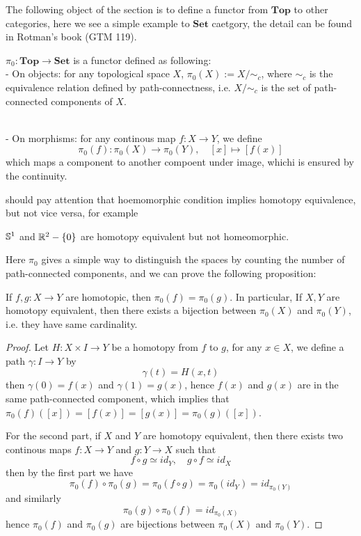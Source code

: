 The following object of the section is to define a functor from \(\mathbf{Top}\) to other categories, here we see a simple example to \(\mathbf{Set}\) caetgory, the detail can be found in Rotman's book (GTM 119).
\begin{definition}
    \(\pi_0: \mathbf{Top} \to \mathbf{Set}\) is a functor defined as following:\\

    - On objects: for any topological space \(X\), \(\pi_0(X) := X/\sim_c\), where \(\sim_c\) is the equivalence relation defined by path-connectness, i.e. \(X/\sim_c\) is the set of path-connected components of \(X\).\\\

    - On morphisms: for any continous map \(f:X \to Y\), we define
    \[\pi_0(f): \pi_0(X) \to \pi_0(Y), \quad [x] \mapsto [f(x)]\]
    which maps a component to another compoent under image, whichi is ensured by the continuity.
\end{definition}

should pay attention that hoemomorphic condition implies homotopy equivalence, but not vice versa, for example
\begin{center}
    \(\mathbb{S}^1\) and \(\mathbb{R}^2-\{0\}\) are homotopy equivalent but not homeomorphic.
\end{center} 
 Here \(\pi_0\) gives a simple way to distinguish the spaces by counting the number of path-connected components, and we can prove the following proposition:
\begin{proposition}
    If \(f,g:X \to Y\) are homotopic, then \(\pi_0(f) = \pi_0(g)\). In particular, If \(X,Y\) are homotopy equivalent, then there exists a bijection between \(\pi_0(X)\) and \(\pi_0(Y)\), i.e. they have same cardinality.
\end{proposition}

\begin{proof}
    Let \(H:X \times I \to Y\) be a homotopy from \(f\) to \(g\), for any \(x \in X\), we define a path \(\gamma: I \to Y\) by
    \[\gamma(t) = H(x,t)\]
    then \(\gamma(0) = f(x)\) and \(\gamma(1) = g(x)\), hence \(f(x)\) and \(g(x)\) are in the same path-connected component, which implies that \(\pi_0(f)([x]) = [f(x)] = [g(x)] = \pi_0(g)([x])\).

    For the second part, if \(X\) and \(Y\) are homotopy equivalent, then there exists two continous maps \(f:X \to Y\) and \(g:Y \to X\) such that
    \[f \circ g \simeq id_Y, \quad g \circ f \simeq id_X\]
    then by the first part we have
    \[\pi_0(f) \circ \pi_0(g) = \pi_0(f \circ g) = \pi_0(id_Y) = id_{\pi_0(Y)}\]
    and similarly
    \[\pi_0(g) \circ \pi_0(f) = id_{\pi_0(X)}\]
    hence \(\pi_0(f)\) and \(\pi_0(g)\) are bijections between \(\pi_0(X)\) and \(\pi_0(Y)\).
\end{proof}

